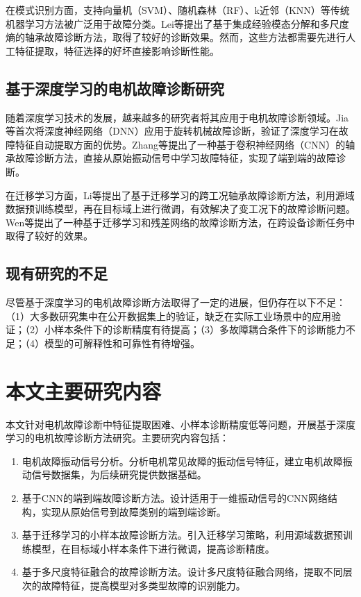 在模式识别方面，支持向量机（SVM）、随机森林（RF）、k近邻（KNN）等传统机器学习方法被广泛用于故障分类。Lei等\cite{lei2020applications}提出了基于集成经验模态分解和多尺度熵的轴承故障诊断方法，取得了较好的诊断效果。然而，这些方法都需要先进行人工特征提取，特征选择的好坏直接影响诊断性能。

\subsection{基于深度学习的电机故障诊断研究}

随着深度学习技术的发展，越来越多的研究者将其应用于电机故障诊断领域。Jia等\cite{jia2016deep}首次将深度神经网络（DNN）应用于旋转机械故障诊断，验证了深度学习在故障特征自动提取方面的优势。Zhang等\cite{zhang2018deep}提出了一种基于卷积神经网络（CNN）的轴承故障诊断方法，直接从原始振动信号中学习故障特征，实现了端到端的故障诊断。

在迁移学习方面，Li等\cite{li2020systematic}提出了基于迁移学习的跨工况轴承故障诊断方法，利用源域数据预训练模型，再在目标域上进行微调，有效解决了变工况下的故障诊断问题。Wen等\cite{wen2020new}提出了一种基于迁移学习和残差网络的故障诊断方法，在跨设备诊断任务中取得了较好的效果。

\subsection{现有研究的不足}

尽管基于深度学习的电机故障诊断方法取得了一定的进展，但仍存在以下不足：（1）大多数研究集中在公开数据集上的验证，缺乏在实际工业场景中的应用验证；（2）小样本条件下的诊断精度有待提高；（3）多故障耦合条件下的诊断能力不足；（4）模型的可解释性和可靠性有待增强。

\section{本文主要研究内容}

本文针对电机故障诊断中特征提取困难、小样本诊断精度低等问题，开展基于深度学习的电机故障诊断方法研究。主要研究内容包括：

\begin{enumerate}
	\item 电机故障振动信号分析。分析电机常见故障的振动信号特征，建立电机故障振动信号数据集，为后续研究提供数据基础。
	\item 基于CNN的端到端故障诊断方法。设计适用于一维振动信号的CNN网络结构，实现从原始信号到故障类别的端到端诊断。
	\item 基于迁移学习的小样本故障诊断方法。引入迁移学习策略，利用源域数据预训练模型，在目标域小样本条件下进行微调，提高诊断精度。
	\item 基于多尺度特征融合的故障诊断方法。设计多尺度特征融合网络，提取不同层次的故障特征，提高模型对多类型故障的识别能力。
\end{enumerate}

